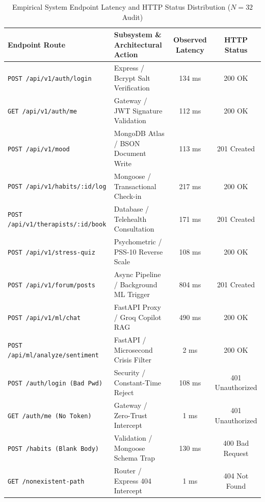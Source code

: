 \begin{table}[H]
\centering
\caption{Empirical System Endpoint Latency and HTTP Status Distribution ($N=32$ Audit)}
\label{tab:api_benchmarks}
\begin{tabular}{llcc}
\toprule
\textbf{Endpoint Route} & \textbf{Subsystem \& Architectural Action} & \textbf{Observed Latency} & \textbf{HTTP Status} \\
\midrule
\texttt{POST /api/v1/auth/login}        & Express / Bcrypt Salt Verification & 134 ms & 200 OK \\
\texttt{GET /api/v1/auth/me}           & Gateway / JWT Signature Validation  & 112 ms & 200 OK \\
\texttt{POST /api/v1/mood}             & MongoDB Atlas / BSON Document Write & 113 ms & 201 Created \\
\texttt{POST /api/v1/habits/:id/log}   & Mongoose / Transactional Check-in   & 217 ms & 200 OK \\
\texttt{POST /api/v1/therapists/:id/book} & Database / Telehealth Consultation  & 171 ms & 201 Created \\
\texttt{POST /api/v1/stress-quiz}      & Psychometric / PSS-10 Reverse Scale & 108 ms & 200 OK \\
\texttt{POST /api/v1/forum/posts}      & Async Pipeline / Background ML Trigger & 804 ms & 201 Created \\
\texttt{POST /api/v1/ml/chat}          & FastAPI Proxy / Groq Copilot RAG    & 490 ms & 200 OK \\
\texttt{POST /api/ml/analyze/sentiment}& FastAPI / Microsecond Crisis Filter & 2 ms   & 200 OK \\
\midrule
\texttt{POST /auth/login (Bad Pwd)}    & Security / Constant-Time Reject     & 108 ms & 401 Unauthorized \\
\texttt{GET /auth/me (No Token)}       & Gateway / Zero-Trust Intercept      & 1 ms   & 401 Unauthorized \\
\texttt{POST /habits (Blank Body)}     & Validation / Mongoose Schema Trap   & 130 ms & 400 Bad Request \\
\texttt{GET /nonexistent-path}         & Router / Express 404 Intercept      & 1 ms   & 404 Not Found \\
\bottomrule
\end{tabular}
\end{table}

